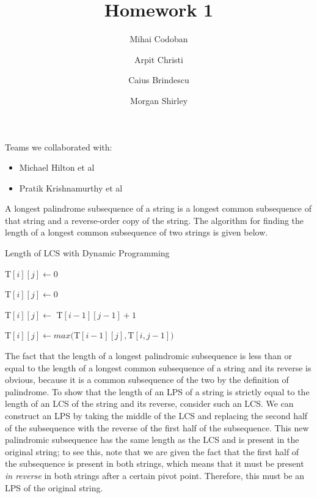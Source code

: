 \documentclass{article}
\title{Homework 1}
\author{Mihai Codoban \and Arpit Christi \and Caius Brindescu \and Morgan Shirley}
\begin{document}
\maketitle

Teams we collaborated with:
\begin{itemize}
	\item Michael Hilton et al
	\item Pratik Krishnamurthy et al
\end{itemize}





A longest palindrome subsequence of a string is a longest common subsequence of that string and a reverse-order copy of the string. The algorithm for finding the length of a longest common subsequence of two strings is given below.

\begin{algorithm}
	\caption{Length of LCS with Dynamic Programming}
	\begin{algorithmic}


		

				 \State T$[i][j] \gets 0$

				 \State T$[i][j] \gets 0$

				 \State T$[i][j] \gets$ T$[i-1][j-1] + 1$

				\Else \State T$[i][j] \gets max($T$[i-1][j], $T$[i, j-1])$

				\EndIf

			\EndFor

		\EndFor

	  \EndFunction
	\end{algorithmic}
\end{algorithm}


The fact that the length of a longest palindromic subsequence is less than or equal to the length of a longest common subsequence of a string and its reverse is obvious, because it is a common subsequence of the two by the definition of palindrome. To show that the length of an LPS of a string is strictly equal to the length of an LCS of the string and its reverse, consider such an LCS. We can construct an LPS by taking the middle of the LCS and replacing the second half of the subsequence with the reverse of the first half of the subsequence. This new palindromic subsequence has the same length as the LCS and is present in the original string; to see this, note that we are given the fact that the first half of the subsequence is present in both strings, which means that it must be present \emph{in reverse} in both strings after a certain pivot point. Therefore, this must be an LPS of the original string.
\end{document}
